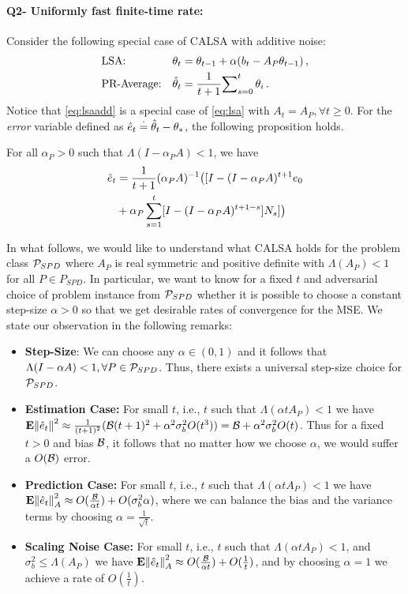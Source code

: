 \paragraph{Q2- Uniformly fast finite-time rate:} Consider the following special case of CALSA with additive noise:
\begin{subequations}\label{eq:lsaadd}
\begin{align}
\label{conststep}&\text{LSA:} &\theta_t&=\theta_{t-1}+\alpha(b_t-A_P\theta_{t-1})\,,\\
\label{iteravg}&\text{PR-Average:} &\thh_t&=\frac{1}{t+1}{\sum}_{s=0}^{t}\,\theta_i\,.
\end{align}
\end{subequations}
Notice that \eqref{eq:lsaadd} is a special case of \eqref{eq:lsa} with $A_t=A_P,\forall t\geq 0$. For the \emph{error} variable defined as $\eh_t\eqdef\thh_t-\ts$, the following proposition holds.
\begin{proposition}\label{prop:erradd}
For all $\alpha_P>0$ such that $\Lambda(I-\alpha_P A)<1$, we have
\begin{align*}
\eh_t&=\frac{1}{t+1}(\alpha_P A)^{-1}\big([I-(I-\alpha_P A)^{t+1}e_0\\
&+\alpha_P\sum_{s=1}^t [I-(I-\alpha_P A)^{t+1-s}] N_s]\big)
\end{align*}
\end{proposition}
In what follows, we would like to understand what CALSA holds for the problem class $\P_{SPD}$ where $A_P$ is real symmetric and positive definite with $\Lambda(A_P)<1$ for all $P\in P_{SPD}$. In particular, we want to know for a fixed $t$ and adversarial choice of problem instance from $\P_{SPD}$ whether it is possible to choose a constant step-size $\alpha>0$ so that we get desirable rates of convergence for the MSE.  
We state our observation in the following remarks:
\begin{itemize}[leftmargin=*]
\item \textbf{Step-Size}: We can choose any $\alpha\in(0,1)$ and it follows that $\Lambda(I-\alpha A)<1, \forall P\in \P_{SPD}$. Thus, there exists a universal step-size choice for $\P_{SPD}$.
\item \textbf{Estimation Case:} For small $t$, i.e., $t$ such that $\Lambda(\alpha t A_P)<1$ we have $\E{\norm{\eh_t}^2}\approx \frac{1}{(t+1)^2}(\B (t+1)^2+ \alpha^2\sigma_b^2 O(t^3))=\B+\alpha^2\sigma_b^2 O(t)$. Thus for a fixed $t>0$ and bias $\B$, it follows that no matter how we choose $\alpha$, we would suffer a $O(\B)$ error.
\item \textbf{Prediction Case:} For small $t$, i.e., $t$ such that $\Lambda(\alpha t A_P)<1$ we have $\E{\norm{\eh_t}^2_A}\approx O(\frac{\B}{\alpha t})+O(\sigma^2_b\alpha)$, where we can balance the bias and the variance terms by choosing $\alpha=\frac{1}{\sqrt{t}}$.
\item \textbf{Scaling Noise Case:} For small $t$, i.e., $t$ such that $\Lambda(\alpha t A_P)<1$, and $\sigma_b^2\leq \Lambda(A_P)$ we have $\E{\norm{\eh_t}^2_A}\approx O(\frac{\B}{\alpha t})+O(\frac{1}{t})$, and by choosing $\alpha=1$ we achieve a rate of $O(\frac{1}{t})$.
\end{itemize}
